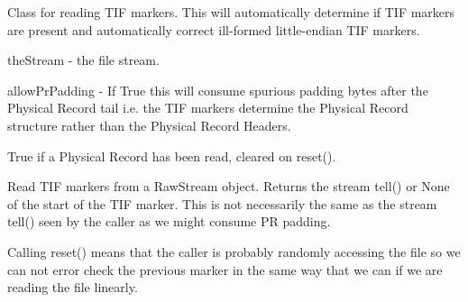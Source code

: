 \documentclass[letterpaper,10pt,english]{sphinxmanual}
\begin{document}

\begin{fulllineitems}
\label{\detokenize{ref/LIS/core/TifMarker:TotalDepth.LIS.core.TifMarker.TifMarkerRead}}
Class for reading TIF markers. This will automatically determine if TIF
markers are present and automatically correct ill-formed little-endian TIF markers.

theStream - the file stream.

allowPrPadding - If True this will consume spurious padding bytes after the
Physical Record tail i.e. the TIF markers determine the Physical Record structure
rather than the Physical Record Headers.

\begin{fulllineitems}
\label{\detokenize{ref/LIS/core/TifMarker:TotalDepth.LIS.core.TifMarker.TifMarkerRead.hasPrevious}}
True if a Physical Record has been read, cleared on reset().

\end{fulllineitems}


\begin{fulllineitems}
\label{\detokenize{ref/LIS/core/TifMarker:TotalDepth.LIS.core.TifMarker.TifMarkerRead.read}}
Read TIF markers from a RawStream object. Returns the stream tell()
or None  of the start of the TIF marker. This is not necessarily the
same as the stream tell() seen by the caller as we might consume PR padding.

\end{fulllineitems}


\begin{fulllineitems}
\label{\detokenize{ref/LIS/core/TifMarker:TotalDepth.LIS.core.TifMarker.TifMarkerRead.reset}}
Calling reset() means that the caller is probably randomly
accessing the file so we can not error check the previous marker in
the same way that we can if we are reading the file linearly.

\end{fulllineitems}


\end{fulllineitems}
\end{document}
